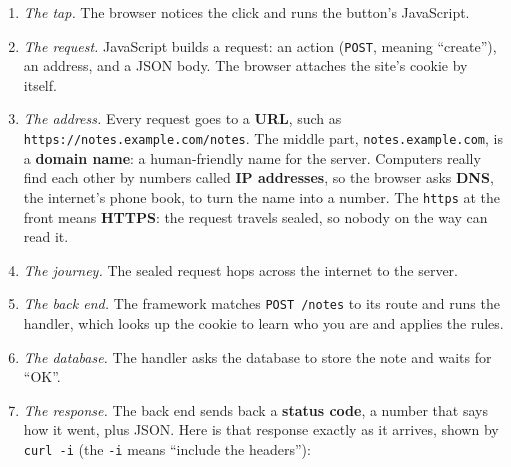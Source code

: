 \begin{enumerate}
\def\labelenumi{\arabic{enumi}.}
\item
  \emph{The tap.} The browser notices the click and runs the button's JavaScript.
\item
  \emph{The request.} JavaScript builds a request: an action (\texttt{POST}, meaning ``create''), an address, and a JSON body. The browser attaches the site's cookie by itself.
\item
  \emph{The address.} Every request goes to a \textbf{URL}, such as \texttt{https:}\allowbreak{}\texttt{/}\allowbreak{}\texttt{/}\allowbreak{}\texttt{notes.}\allowbreak{}\texttt{example.}\allowbreak{}\texttt{com/}\allowbreak{}\texttt{notes}. The middle part, \texttt{notes.example.com}, is a \textbf{domain name}: a human-friendly name for the server. Computers really find each other by numbers called \textbf{IP addresses}, so the browser asks \textbf{DNS}, the internet's phone book, to turn the name into a number. The \texttt{https} at the front means \textbf{HTTPS}: the request travels sealed, so nobody on the way can read it.
\item
  \emph{The journey.} The sealed request hops across the internet to the server.
\item
  \emph{The back end.} The framework matches \texttt{POST\ /notes} to its route and runs the handler, which looks up the cookie to learn who you are and applies the rules.
\item
  \emph{The database.} The handler asks the database to store the note and waits for ``OK''.
\item
  \emph{The response.} The back end sends back a \textbf{status code}, a number that says how it went, plus JSON. Here is that response exactly as it arrives, shown by \texttt{curl\ -i} (the \texttt{-i} means ``include the headers''):

  \begin{codeblock}

\begin{Shaded}
\begin{Highlighting}[]
  \DataTypeTok{\textbackslash{}}
    \DataTypeTok{\textbackslash{}}
   
\end{Highlighting}
\end{Shaded}


\end{codeblock}
\end{enumerate}
